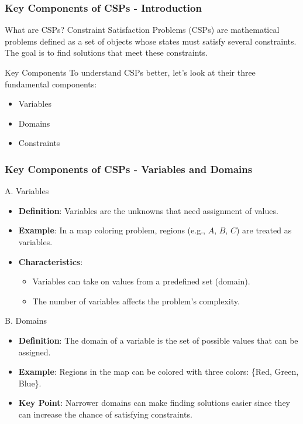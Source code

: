 \documentclass[aspectratio=169]{beamer}
\begin{document}
\begin{frame}[fragile]
    \frametitle{Key Components of CSPs - Introduction}
    \begin{block}{What are CSPs?}
        Constraint Satisfaction Problems (CSPs) are mathematical problems defined as a set of objects whose states must satisfy several constraints. The goal is to find solutions that meet these constraints.
    \end{block}
    \begin{block}{Key Components}
        To understand CSPs better, let's look at their three fundamental components:
        \begin{itemize}
            \item Variables
            \item Domains
            \item Constraints
        \end{itemize}
    \end{block}
\end{frame}

\begin{frame}[fragile]
    \frametitle{Key Components of CSPs - Variables and Domains}
    \begin{block}{A. Variables}
        \begin{itemize}
            \item \textbf{Definition}: Variables are the unknowns that need assignment of values.
            \item \textbf{Example}: In a map coloring problem, regions (e.g., $A$, $B$, $C$) are treated as variables.
            \item \textbf{Characteristics}: 
            \begin{itemize}
                \item Variables can take on values from a predefined set (domain).
                \item The number of variables affects the problem's complexity.
            \end{itemize}
        \end{itemize}
    \end{block}

    \begin{block}{B. Domains}
        \begin{itemize}
            \item \textbf{Definition}: The domain of a variable is the set of possible values that can be assigned.
            \item \textbf{Example}: Regions in the map can be colored with three colors: \{Red, Green, Blue\}.
            \item \textbf{Key Point}: Narrower domains can make finding solutions easier since they can increase the chance of satisfying constraints.
        \end{itemize}
    \end{block}
\end{frame}
\end{document}
